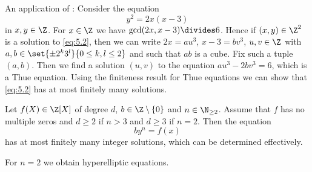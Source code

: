 An application of :
Consider the equation 
\begin{equation}\label{eq:5.2}
	y^2 = 2x(x-3)
\end{equation}
in \( x,y \in \Z \).
For \( x \in \Z \) we have \( \gcd(2x, x-3) \divides 6 \).
Hence if \( (x,y) \in \Z^2 \) is a solution to \eqref{eq:5.2}, then we can write \( 2x = au^3 \), \( x-3 = bv^3 \), \( u, v \in \Z \) with \( a,b \in \set{\pm 2^k3^l}{0 \leq k,l \leq 2} \) and such that \( ab \) is a cube.
Fix such a tuple \( (a,b) \).
Then we find a solution \( (u,v) \) to the equation \( au^3 - 2bv^3 = 6 \), which is a Thue equation.
Using the finiteness result for Thue equations we can show that \eqref{eq:5.2} has at most finitely many solutions.

\begin{thm}[Baker, 1968]
	Let \( f(X) \in \Z[X] \) of degree \( d \), \( b \in \Z \setminus \{0\} \) and \( n \in \N_{\geq 2} \).
	Assume that \( f \) has no multiple zeros and \( d \geq 2 \) if \( n > 3 \) and \( d \geq 3 \) if \( n = 2 \).
	Then the equation
	\[ by^n = f(x) \]
	has at most finitely many integer solutions, which can be determined effectively.
\end{thm}

\begin{rem*}
	For \( n = 2 \) we obtain hyperelliptic equations.
\end{rem*}